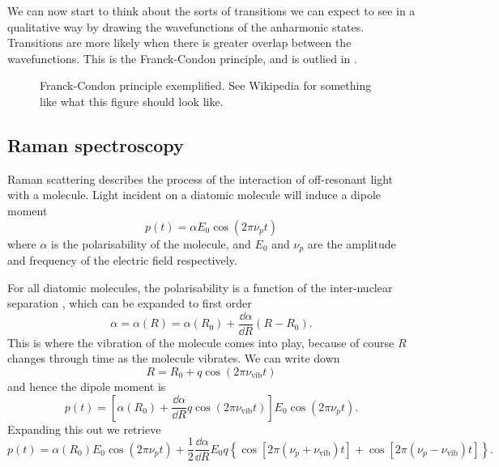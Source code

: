 We can now start to think about the sorts of transitions we can expect to see in
a qualitative way by drawing the wavefunctions of the anharmonic states.
Transitions are more likely  when there is greater overlap
between the wavefunctions. This is the Franck-Condon principle, and is outlied
in .

\begin{figure}
  \caption{Franck-Condon principle exemplified. See Wikipedia for something like
  what this figure should look like.}
  \label{diaspec:fig:franckcondon}
\end{figure}


\subsection{Raman spectroscopy}

Raman scattering describes the process of the interaction of off-resonant light
with a molecule.  Light incident on a diatomic molecule will induce a dipole
moment
%
\begin{equation}
  p(t) = \alpha E_0 \cos(2\pi\nu_p t)
\end{equation}
%
where $\alpha$ is the polarisability of the molecule, and $E_0$ and $\nu_p$ are
the amplitude and frequency of the electric field respectively.

For all diatomic molecules, the polarisability is a function of the
inter-nuclear separation \cite{}, which can be expanded to first order
%
\begin{equation}
\alpha = \alpha(R) = \alpha(R_0) + \frac{\dd \alpha}{\dd R}(R - R_0).
\end{equation}
%
This is where the vibration of the molecule comes into play, because of course
$R$ changes through time as the molecule vibrates. We can write down
%
\begin{equation}
R = R_0 + q \cos (2\pi \nu_\text{vib} t)
\end{equation}
and hence the dipole moment is
\begin{equation}
p(t) = \left[ \alpha(R_0) + \frac{\dd \alpha}{\dd R} q\cos (2\pi\nu_\text{vib}t)
\right] E_0 \cos(2\pi\nu_p t).
\end{equation}
Expanding this out we retrieve
\begin{equation}
p(t) = \alpha(R_0)E_0\cos(2\pi\nu_p t) + \frac{1}{2}\frac{\dd \alpha}{\dd R}
E_0 q \left\{ \cos\left[ 2\pi(\nu_p + \nu_\text{vib})t\right]
+ \cos\left[ 2\pi(\nu_p - \nu_\text{vib})t\right] \right\}.
\end{equation}

